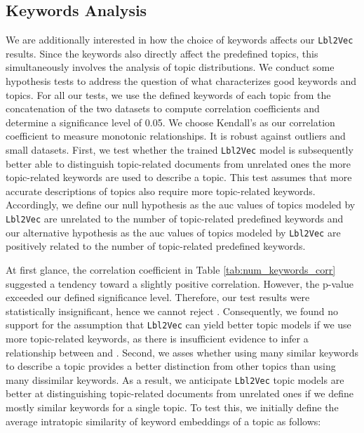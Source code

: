\documentclass[a4paper,twoside]{article}
\begin{document}
\subsection{Keywords Analysis}

We are additionally interested in how the choice of keywords affects our \texttt{Lbl2Vec} results. Since the keywords also directly affect the predefined topics, this simultaneously involves the analysis of topic distributions. We conduct some hypothesis tests to address the question of what characterizes good keywords and topics. For all our tests, we use the defined keywords of each topic from the concatenation of the two datasets to compute correlation coefficients and determine a significance level of 0.05. We choose Kendall's  as our correlation coefficient to measure monotonic relationships. It is robust against outliers and small datasets.\newline
\newline First, we test whether the trained \texttt{Lbl2Vec} model is subsequently better able to distinguish topic-related documents from unrelated ones the more topic-related keywords are used to describe a topic. This test assumes that more accurate descriptions of topics also require more topic-related keywords. Accordingly, we define our null hypothesis  as the \ac{auc} values of topics modeled by \texttt{Lbl2Vec} are unrelated to the number of topic-related predefined keywords and our alternative hypothesis  as the \ac{auc} values of topics modeled by \texttt{Lbl2Vec} are positively related to the number of topic-related predefined keywords. 
\begin{table}[ht]
\centering
{}\caption{\label{tab:num_keywords_corr} Correlation values that measure the relationship between  and  value of a topic.  and .}
\end{table}
At first glance, the correlation coefficient in Table \ref{tab:num_keywords_corr} suggested a tendency toward a slightly positive correlation. However, the p-value exceeded our defined significance level. Therefore, our test results were statistically insignificant, hence we cannot reject . Consequently, we found no support for the assumption that \texttt{Lbl2Vec} can yield better topic models if we use more topic-related keywords, as there is insufficient evidence to infer a relationship between  and .\newline
\newline Second, we asses whether using many similar keywords to describe a topic provides a better distinction from other topics than using many dissimilar keywords. As a result, we anticipate \texttt{Lbl2Vec} topic models are better at distinguishing topic-related documents from unrelated ones if we define mostly similar keywords for a single topic. To test this, we initially define the average intratopic similarity of keyword embeddings  of a topic  as follows:
\end{document}
